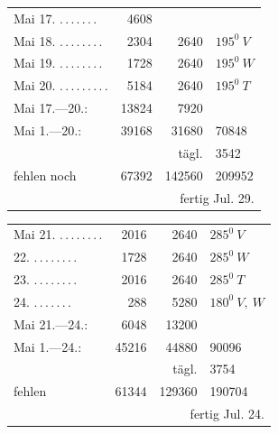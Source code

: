 \begin{center}
\begin{tabular}{@{}p{.36\linewidth}rrl@{}}
Mai 17. \BJournalDay{☉}\nobreak\hspace{.2em}\mbox{.\,.\,.\,.\,.\,.\,.}\hfill&4608&&\\
Mai 18. \BJournalDay{☾}\nobreak\hspace{.2em}\mbox{.\,.\,.\,.\,.\,.\,.\,.}\hfill&2304&2640&\(\mathit{195}^0\ V\)\\
Mai 19. \BJournalDay{♂}\nobreak\hspace{.2em}\mbox{.\,.\,.\,.\,.\,.\,.\,.}\hfill&1728&2640&\(\mathit{195}^0\ W\)\\
Mai 20. \BJournalDay{☿}\nobreak\hspace{.2em}\mbox{.\,.\,.\,.\,.\,.\,.\,.\,.}\hfill&5184&2640&\(\mathit{195}^0\ T\)\\
\hfill Mai 17.—20.:&13824&7920&\\
\hfill Mai 1.—20.:&39168&31680&70848\\
&&tägl.&3542\\
\hfill fehlen noch&67392&142560&209952\\
\multicolumn{4}{r}{fertig Jul. 29.}\\
\hline
\end{tabular}
\end{center}
\begin{center}
\begin{tabular}{@{}p{.36\linewidth}rrl@{}}
Mai 21. \BJournalDay{♃}\nobreak\hspace{.2em}\mbox{.\,.\,.\,.\,.\,.\,.\,.}\hfill&2016&2640&\(\mathit{285}^0\ V\)\\
\hspace*{\fill}22. \BJournalDay{♀}\nobreak\hspace{.2em}\mbox{.\,.\,.\,.\,.\,.\,.\,.}\hfill&1728&2640&\(\mathit{285}^0\ W\)\\
\hspace*{\fill}23. \BJournalDay{♄}\nobreak\hspace{.2em}\mbox{.\,.\,.\,.\,.\,.\,.\,.}\hfill&2016&2640&\(\mathit{285}^0\ T\)\\
\hspace*{\fill}24. \BJournalDay{☉}\nobreak\hspace{.2em}\mbox{.\,.\,.\,.\,.\,.\,.}\hfill&288&5280&\(\mathit{180}^0\ V,\ W\)\\
\hfill Mai 21.—24.:&6048&13200&\\
\hfill Mai 1.—24.:&45216&44880&90096\\
&&tägl.&3754\\
\hfill fehlen&61344&129360&190704\\
\multicolumn{4}{r}{fertig Jul. 24.}\\
\hline
\end{tabular}
\end{center}
\endgroup
\endgroup
\clearpage
\endgroup
